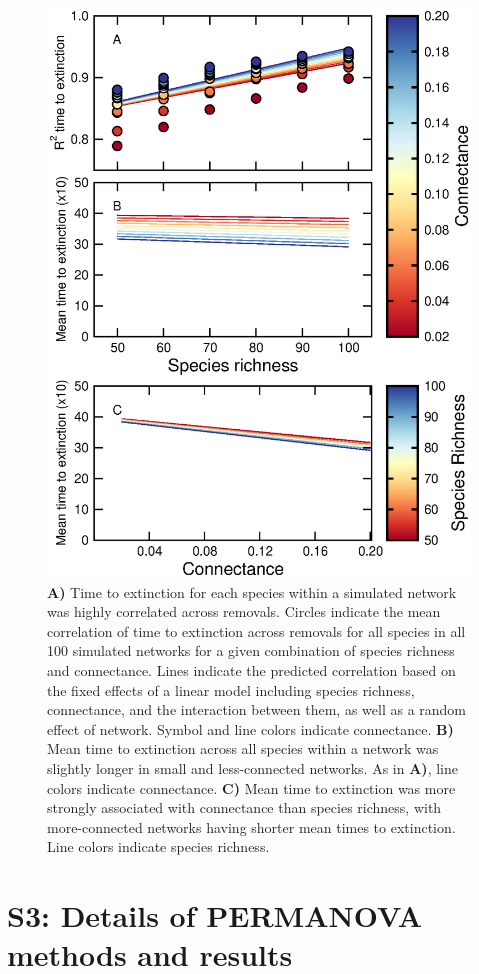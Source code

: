 \documentclass[12pt]{article}
\begin{document}
\begin{spacing}{2.0}
		\begin{figure}[h!]
			\caption{\textbf{A)} Time to extinction for each species within a simulated network was highly correlated across removals. Circles indicate the mean correlation of time to extinction across removals for all species in all 100 simulated networks for a given combination of species richness and connectance. Lines indicate the predicted correlation based on the fixed effects of a linear model including species richness, connectance, and the interaction between them, as well as a random effect of network. Symbol and line colors indicate connectance. \textbf{B)} Mean time to extinction across all species within a network was slightly longer in small and less-connected networks. As in \textbf{A)}, line colors indicate connectance. \textbf{C)} Mean time to extinction was more strongly associated with connectance than species richness, with more-connected networks having shorter mean times to extinction. Line colors indicate species richness.}
			\label{extorder_corrs}
			\includegraphics[width=.75\textwidth]{figures/extinction_order/extorder_correlations.eps}
			\end{figure}		

\clearpage


\section*{S3: Details of PERMANOVA methods and results}


\end{spacing}
\end{document}
